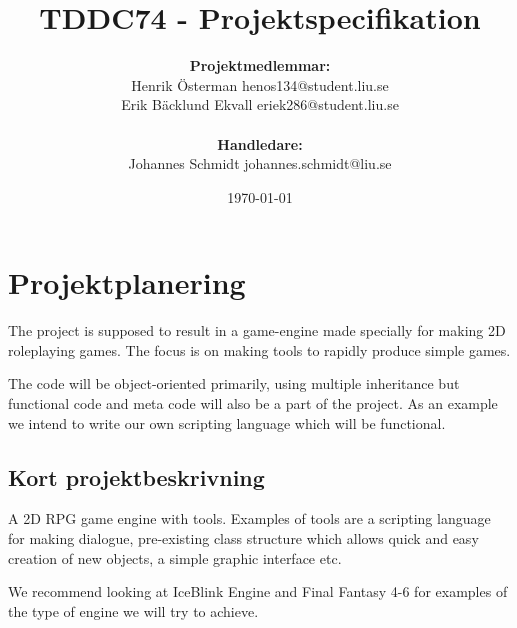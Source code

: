 \documentclass[12pt,a4paper]{article}
\title{TDDC74 -  Projektspecifikation}
\author{\textbf{Projektmedlemmar:}\\
Henrik Österman \small{henos134@student.liu.se}\\
Erik Bäcklund Ekvall \small{eriek286@student.liu.se}\\ 
\bigskip\\ \textbf{Handledare:}\\
Johannes Schmidt {\small johannes.schmidt@liu.se}}
\date{\today}
\begin{document}
\maketitle
\newpage

\tableofcontents
\newpage

\section{Projektplanering}

The project is supposed to result in a game-engine made specially for making 2D roleplaying games. 
The focus is on making tools to rapidly produce simple games.

The code will be object-oriented primarily, using multiple inheritance but functional code and meta code will also be a part of the project. As an example we intend to write our own scripting language which will be functional.


\subsection{Kort projektbeskrivning}

A 2D RPG game engine with tools.
Examples of tools are a scripting language for making dialogue, pre-existing class structure which allows quick and easy creation of new objects, a simple graphic interface etc.

We recommend looking at IceBlink Engine and Final Fantasy 4-6 for examples of the type of engine we will try to achieve.

\end{document}

